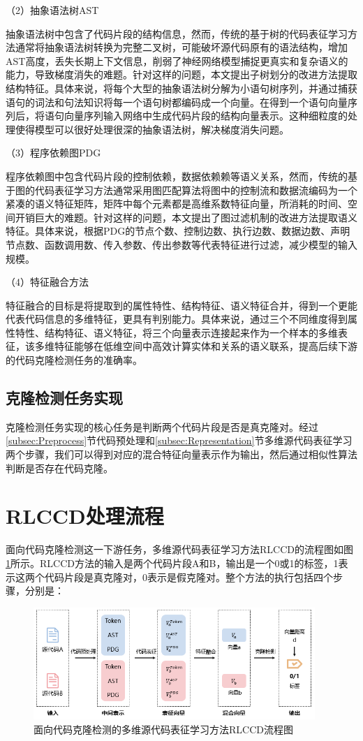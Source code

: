（2）抽象语法树AST

抽象语法树中包含了代码片段的结构信息，然而，传统的基于树的代码表征学习方法通常将抽象语法树转换为完整二叉树，可能破坏源代码原有的语法结构，增加AST高度，丢失长期上下文信息，削弱了神经网络模型捕捉更真实和复杂语义的能力，导致梯度消失的难题。针对这样的问题，本文提出子树划分的改进方法提取结构特征。具体来说，将每个大型的抽象语法树分解为小语句树序列，并通过捕获语句的词法和句法知识将每一个语句树都编码成一个向量。在得到一个语句向量序列后，将语句向量序列输入网络中生成代码片段的结构向量表示。这种细粒度的处理使得模型可以很好处理很深的抽象语法树，解决梯度消失问题。

（3）程序依赖图PDG

程序依赖图中包含代码片段的控制依赖，数据依赖赖等语义关系，然而，传统的基于图的代码表征学习方法通常采用图匹配算法将图中的控制流和数据流编码为一个紧凑的语义特征矩阵，矩阵中每个元素都是高维系数特征向量，所消耗的时间、空间开销巨大的难题。针对这样的问题，本文提出了图过滤机制的改进方法提取语义特征。具体来说，根据PDG的节点个数、控制边数、执行边数、数据边数、声明节点数、函数调用数、传入参数、传出参数等代表特征进行过滤，减少模型的输入规模。

（4）特征融合方法

特征融合的目标是将提取到的属性特性、结构特征、语义特征合并，得到一个更能代表代码信息的多维特征，更具有判别能力。具体来说，通过三个不同维度得到属性特性、结构特征、语义特征，将三个向量表示连接起来作为一个样本的多维表征，该多维特征能够在低维空间中高效计算实体和关系的语义联系，提高后续下游的代码克隆检测任务的准确率。

\subsection{克隆检测任务实现}
\label{subsec:Clone detection}
克隆检测任务实现的核心任务是判断两个代码片段是否是真克隆对。经过\ref{subsec:Preprocess}节代码预处理和\ref{subsec:Representation}节多维源代码表征学习两个步骤，我们可以得到对应的混合特征向量表示作为输出，然后通过相似性算法判断是否存在代码克隆。

\section{RLCCD处理流程}
\label{sec:RLCCD flow}
面向代码克隆检测这一下游任务，多维源代码表征学习方法RLCCD的流程图如图\ref{fig:flow}所示。RLCCD方法的输入是两个代码片段A和B，输出是一个0或1的标签，1表示这两个代码片段是真克隆对，0表示是假克隆对。整个方法的执行包括四个步骤，分别是：
\begin{figure}[H]
    \centering
    \includegraphics[width=0.95\textwidth]{figures/flow}
    \caption{面向代码克隆检测的多维源代码表征学习方法RLCCD流程图}
    \label{fig:flow}
\end{figure}

